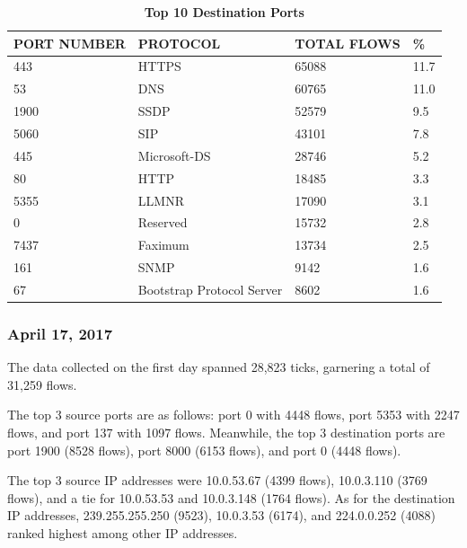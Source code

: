 \documentclass[journal]{IEEE/IEEEtran}
\begin{document}
\begin{table}[ht]
\centering
\caption{\textbf{Top 10 Destination Ports}}
\label{top-out-flows}
\begin{tabular}{|l|l|l|l|}
\hline
\textbf{PORT NUMBER}			& \textbf{PROTOCOL}			& \textbf{TOTAL FLOWS}		& \textbf{\%} 	 \\ \hline
    443							& HTTPS						&  65088					& 11.7  	     \\ \hline
    53							& DNS						&  60765        			& 11.0			 \\ \hline
    1900						& SSDP						&  52579					& 9.5			 \\ \hline
    5060						& SIP						&  43101          			& 7.8   	     \\ \hline
    445							& Microsoft-DS				&  28746           			& 5.2        	 \\ \hline
    80							& HTTP						&  18485					& 3.3         	 \\ \hline
    5355						& LLMNR						&  17090    		        & 3.1    	     \\ \hline
    0							& Reserved					&  15732		            & 2.8       	 \\ \hline
    7437						& Faximum					&  13734        		    & 2.5         	 \\ \hline
    161							& SNMP						&  9142        			    & 1.6         	 \\ \hline
    67							& Bootstrap Protocol Server	&  8602        			    & 1.6         	 \\ \hline
\end{tabular}
\end{table}

\subsubsection{\textbf{April 17, 2017}}
The data collected on the first day spanned 28,823 ticks, garnering a total of 31,259 flows.

The top 3 source ports are as follows: port 0 with 4448 flows, port 5353 with 2247 flows, and port 137 with 1097 flows. Meanwhile, the top 3 destination ports are port 1900 (8528 flows), port 8000 (6153 flows), and port 0 (4448 flows).

The top 3 source IP addresses were 10.0.53.67 (4399 flows), 10.0.3.110 (3769 flows), and a tie for 10.0.53.53 and 10.0.3.148 (1764 flows). As for the destination IP addresses, 239.255.255.250 (9523), 10.0.3.53 (6174), and 224.0.0.252 (4088) ranked highest among other IP addresses.
\end{document}
